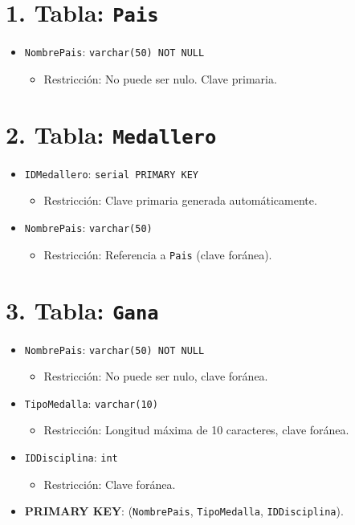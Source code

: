\section*{1. Tabla: \texttt{Pais}}
\begin{itemize}
    \item \texttt{NombrePais}: \texttt{varchar(50) NOT NULL} 
    \begin{itemize}
        \item Restricción: No puede ser nulo. Clave primaria.
    \end{itemize}
\end{itemize}

\section*{2. Tabla: \texttt{Medallero}}
\begin{itemize}
    \item \texttt{IDMedallero}: \texttt{serial PRIMARY KEY} 
    \begin{itemize}
        \item Restricción: Clave primaria generada automáticamente.
    \end{itemize}
    \item \texttt{NombrePais}: \texttt{varchar(50)} 
    \begin{itemize}
        \item Restricción: Referencia a \texttt{Pais} (clave foránea).
    \end{itemize}
\end{itemize}

\section*{3. Tabla: \texttt{Gana}}
\begin{itemize}
    \item \texttt{NombrePais}: \texttt{varchar(50) NOT NULL}
    \begin{itemize}
        \item Restricción: No puede ser nulo, clave foránea.
    \end{itemize}
    \item \texttt{TipoMedalla}: \texttt{varchar(10)}
    \begin{itemize}
        \item Restricción: Longitud máxima de 10 caracteres, clave foránea.
    \end{itemize}
    \item \texttt{IDDisciplina}: \texttt{int}
    \begin{itemize}
        \item Restricción: Clave foránea.
    \end{itemize}
    \item \textbf{PRIMARY KEY}: (\texttt{NombrePais}, \texttt{TipoMedalla}, \texttt{IDDisciplina}).
\end{itemize}

